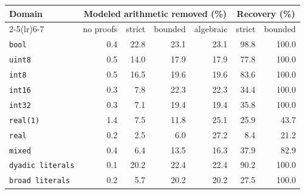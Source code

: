 \begin{tabular}{lrrrrrr}
\toprule
Domain & \multicolumn{4}{c}{Modeled arithmetic removed (\%)} & \multicolumn{2}{c}{Recovery (\%)}\\
\cmidrule(lr){2-5}\cmidrule(lr){6-7}
 & no proofs & strict & bounded & algebraic & strict & bounded\\
\midrule
\texttt{bool} & 0.4 & 22.8 & 23.1 & 23.1 & 98.8 & 100.0\\
\texttt{uint8} & 0.5 & 14.0 & 17.9 & 17.9 & 77.8 & 100.0\\
\texttt{int8} & 0.5 & 16.5 & 19.6 & 19.6 & 83.6 & 100.0\\
\texttt{int16} & 0.3 & 7.8 & 22.3 & 22.3 & 34.4 & 100.0\\
\texttt{int32} & 0.3 & 7.1 & 19.4 & 19.4 & 35.8 & 100.0\\
\texttt{real(1)} & 1.4 & 7.5 & 11.8 & 25.1 & 25.9 & 43.7\\
\texttt{real} & 0.2 & 2.5 & 6.0 & 27.2 & 8.4 & 21.2\\
\texttt{mixed} & 0.4 & 6.4 & 13.5 & 16.3 & 37.9 & 82.9\\
\texttt{dyadic literals} & 0.1 & 20.2 & 22.4 & 22.4 & 90.2 & 100.0\\
\texttt{broad literals} & 0.2 & 5.7 & 20.2 & 20.2 & 27.5 & 100.0\\
\bottomrule
\end{tabular}
